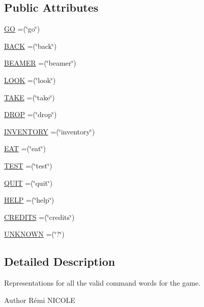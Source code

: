 \subsection*{Public Attributes}
\begin{DoxyCompactItemize}
\item 
\hyperlink{enumCommandWord_ab85d8b5fa5f3890548bff9a1ccfba218}{G\-O} =(\char`\"{}go\char`\"{})
\item 
\hyperlink{enumCommandWord_a3309e549607eb8de673c296db55f7517}{B\-A\-C\-K} =(\char`\"{}back\char`\"{})
\item 
\hyperlink{enumCommandWord_ab916560f94837341b38c83aa3cf5497f}{B\-E\-A\-M\-E\-R} =(\char`\"{}beamer\char`\"{})
\item 
\hyperlink{enumCommandWord_ae56e5a1529f673fe19373fed2717cd8c}{L\-O\-O\-K} =(\char`\"{}look\char`\"{})
\item 
\hyperlink{enumCommandWord_ac113629c0d6a8ebe3f4050a50d904a17}{T\-A\-K\-E} =(\char`\"{}take\char`\"{})
\item 
\hyperlink{enumCommandWord_a68dbdfb6cdd48bebfc70980afad6d453}{D\-R\-O\-P} =(\char`\"{}drop\char`\"{})
\item 
\hyperlink{enumCommandWord_a624e48d45c9a1c4f614c62faa553c855}{I\-N\-V\-E\-N\-T\-O\-R\-Y} =(\char`\"{}inventory\char`\"{})
\item 
\hyperlink{enumCommandWord_a8a3ddfcc3d3f62697323325970089d95}{E\-A\-T} =(\char`\"{}eat\char`\"{})
\item 
\hyperlink{enumCommandWord_a12071308fc3289269d190f8fe5dd95b4}{T\-E\-S\-T} =(\char`\"{}test\char`\"{})
\item 
\hyperlink{enumCommandWord_aa606b7593e9ff8c395e091a0f726e348}{Q\-U\-I\-T} =(\char`\"{}quit\char`\"{})
\item 
\hyperlink{enumCommandWord_a8689456b5990b4dfa2c69427a862784d}{H\-E\-L\-P} =(\char`\"{}help\char`\"{})
\item 
\hyperlink{enumCommandWord_aff84c19093cea7bf97301062fe61e0a4}{C\-R\-E\-D\-I\-T\-S} =(\char`\"{}credits\char`\"{})
\item 
\hyperlink{enumCommandWord_a7fac6077f2157eb151a67206fd39c3b9}{U\-N\-K\-N\-O\-W\-N} =(\char`\"{}?\char`\"{})
\end{DoxyCompactItemize}


\subsection{Detailed Description}
Representations for all the valid command words for the game. \begin{DoxyAuthor}{Author}
Rémi N\-I\-C\-O\-L\-E 
\end{DoxyAuthor}


